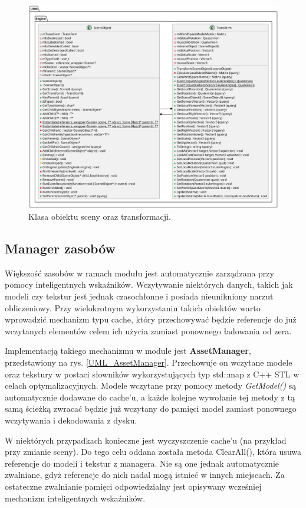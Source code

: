 	\begin{figure}[h!]
		\centering
		\includegraphics[width=\textwidth]{images/UML/sceneobject.png}
		\caption{Klasa obiektu sceny oraz transformacji.}
		\label{UML_SceneObject}
	\end{figure}
	
\subsection{Manager zasobów}
	Większość zasobów w ramach modułu jest automatycznie zarządzana przy pomocy inteligentnych wskaźników. Wczytywanie niektórych danych, takich jak modeli czy tekstur jest jednak czasochłonne i posiada nieunikniony narzut obliczeniowy. Przy wielokrotnym wykorzystaniu takich obiektów warto wprowadzić mechanizm typu cache, który przechowywać będzie referencje do już wczytanych elementów celem ich użycia zamiast ponownego ładowania od zera.
	
	Implementacją takiego mechanizmu w module jest \textbf{AssetManager}, przedstawiony na rys. \ref{UML_AssetManager}. Przechowuje on wczytane modele oraz tekstury w postaci słowników wykorzystujących typ std::map z C++ STL w celach optymalizacyjnych. Modele wczytane przy pomocy metody \textit{GetModel()} są automatycznie dodawane do cache'u, a każde kolejne wywołanie tej metody z tą samą ścieżką zwracać będzie już wczytany do pamięci model zamiast ponownego wczytywania i dekodowania z dysku.
	
	W niektórych przypadkach konieczne jest wyczyszczenie cache'u (na przykład przy zmianie sceny). Do tego celu oddana została metoda ClearAll(), która usuwa referencje do modeli i tekstur z managera. Nie są one jednak automatycznie zwalniane, gdyż referencje do nich nadal mogą istnieć w innych miejscach. Za ostateczne zwalnianie pamięci odpowiedzialny jest opisywany wcześniej mechanizm inteligentnych wskaźników.
	
